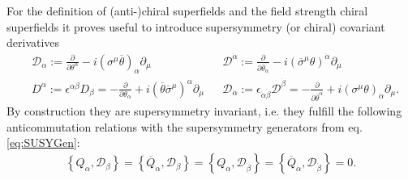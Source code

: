 For the definition of (anti-)chiral superfields and the field strength chiral superfields it proves useful to introduce supersymmetry (or chiral) covariant derivatives 
\begin{align}
&\mathcal{D}_\alpha := \frac{\partial}{\partial \theta^\alpha} - i(\sigma^\mu\overline{\theta})_\alpha\partial_\mu && \mathcal{D}^{\dot{\alpha}} := \frac{\partial}{\partial \overline{\theta}_{\dot{\alpha}}} - i(\overline{\sigma}^\mu\theta)^{\dot{\alpha}} \partial_\mu\nonumber\\
&D^\alpha := \epsilon^{\alpha\beta} D_\beta = -\frac{\partial}{\partial \theta_\alpha} + i(\overline{\theta} \overline{\sigma}^\mu)^\alpha \partial_\mu && \mathcal{D}_{\dot{\alpha}} := \epsilon_{\dot{\alpha}\dot{\beta}} \mathcal{D}^{\dot{\beta}} = -\frac{\partial}{\partial \overline{\theta}^{\dot{\alpha}}} + i(\sigma^\mu\theta)_{\dot{\alpha}} \partial_\mu.
\end{align}
By construction they are supersymmetry invariant, i.e. they fulfill the following anticommutation relations with the supersymmetry generators from eq. \ref{eq:SUSYGen}:
\begin{align}
\left\{ Q_\alpha, \mathcal{D}_\beta \right\} = \left\{ \overline{Q}_{\dot{\alpha}}, \mathcal{D}_\beta \right\} = \left\{ Q_\alpha, \mathcal{\mathcal{D}}_{\dot{\beta}} \right\} = \left\{ \overline{Q}_{\dot{\alpha}}, \mathcal{\mathcal{D}}_{\dot{\beta}} \right\} = 0.
\end{align}


